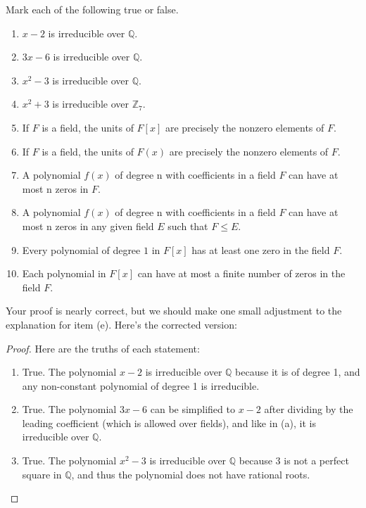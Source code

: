 \documentclass[12pt]{amsart}
\theoremstyle{definition}
\numberwithin{equation}{section}
\theoremstyle{plain}
\newcommand{\Z}{\mathbb{Z}}
\newcommand{\Q}{\mathbb{Q}}
\begin{document}
\begin{exercise}{25} Mark each of the following true or false.
\begin{enumerate}[label=\alph*.]
    \item $x - 2$ is irreducible over $\Q$.
    \item $3x - 6$ is irreducible over $\Q$.
    \item $x^2 - 3$ is irreducible over $\Q$.
    \item $x^2 + 3$ is irreducible over $\Z_7$.
    \item If $F$ is a field, the units of $F[x]$ are precisely the nonzero elements of $F$.
    \item If $F$ is a field, the units of $F(x)$ are precisely the nonzero elements of $F$.
    \item A polynomial $f (x)$ of degree n with coefficients in a field $F$ can have at most n zeros in $F$.
    \item A polynomial $f (x)$ of degree n with coefficients in a field $F$ can have at most n zeros in any given
    field $E$ such that $F \leq E$.
    \item Every polynomial of degree $1$ in $F[x]$ has at least one zero in the field $F$.
    \item Each polynomial in $F[x]$ can have at most a finite number of zeros in the field $F$.
\end{enumerate}
Your proof is nearly correct, but we should make one small adjustment to the explanation for item (e). Here's the corrected version:

\begin{proof}
Here are the truths of each statement:

\begin{enumerate}[label=(\alph*.)]
    \item True. The polynomial \( x - 2 \) is irreducible over \( \mathbb{Q} \) because it is of degree 1, and any non-constant polynomial of degree 1 is irreducible.
    
    \item True. The polynomial \( 3x - 6 \) can be simplified to \( x - 2 \) after dividing by the leading coefficient (which is allowed over fields), and like in (a), it is irreducible over \( \mathbb{Q} \).
    
    \item True. The polynomial \( x^2 - 3 \) is irreducible over \( \mathbb{Q} \) because \( 3 \) is not a perfect square in \( \mathbb{Q} \), and thus the polynomial does not have rational roots.
    

\end{enumerate}
\end{proof}
\end{exercise}
\end{document}
